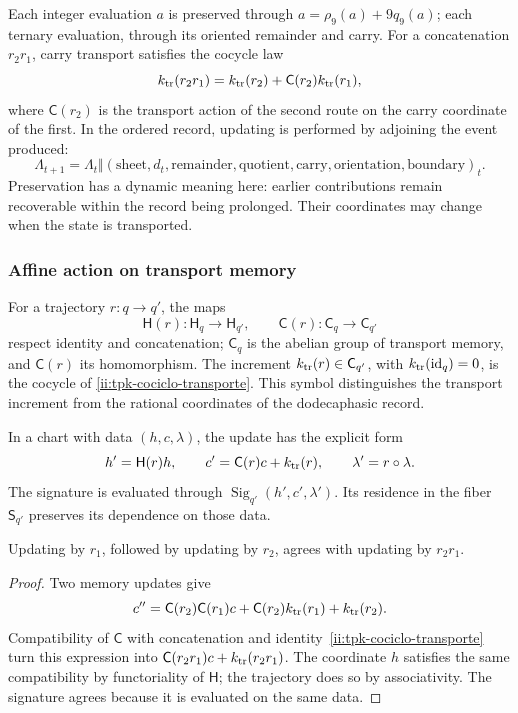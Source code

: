 Each integer evaluation \(a\) is preserved through
\(a=\rho_9(a)+9q_9(a)\); each ternary evaluation, through its oriented
remainder and carry. For a concatenation \(r_2r_1\), carry
transport satisfies the cocycle law
\begin{equation}
 k_{\rm tr}(r_2r_1)
 =k_{\rm tr}(r_2)+\mathsf C(r_2)k_{\rm tr}(r_1),
 \label{ii:tpk-cociclo-transporte}
\end{equation}
where \(\mathsf C(r_2)\) is the transport action of the second route
on the carry coordinate of the first. In the ordered record,
updating is performed by adjoining the event produced:
\[
 \Lambda_{t+1}=\Lambda_t\Vert
 (\text{sheet},d_t,\text{remainder},\text{quotient},
   \text{carry},\text{orientation},\text{boundary})_t.
\]
Preservation has a dynamic meaning here: earlier contributions
remain recoverable within the record being prolonged.
Their coordinates may change when the state is transported.

\subsubsection{Affine action on transport memory}

For a trajectory \(r:q\to q'\), the maps
\[
 \mathsf H(r):\mathsf H_q\to\mathsf H_{q'},\qquad
 \mathsf C(r):\mathsf C_q\to\mathsf C_{q'}
\]
respect identity and concatenation; \(\mathsf C_q\) is the abelian
group of transport memory, and \(\mathsf C(r)\) its homomorphism.
The increment \(k_{\rm tr}(r)\in\mathsf C_{q'}\), with
\(k_{\rm tr}(\operatorname{id}_q)=0\), is the cocycle of
\eqref{ii:tpk-cociclo-transporte}. This symbol distinguishes the transport
increment from the rational coordinates of the dodecaphasic record.

In a chart with data \((h,c,\lambda)\), the update has the
explicit form
\begin{equation}
 h'=\mathsf H(r)h,\qquad
 c'=\mathsf C(r)c+k_{\rm tr}(r),\qquad
 \lambda'=r\circ\lambda.
 \label{ii:tpk-accion-afin}
\end{equation}
The signature is evaluated through
\(\operatorname{Sig}_{q'}(h',c',\lambda')\). Its residence in the
fiber \(\mathsf S_{q'}\) preserves its dependence on those data.

\begin{proposition}
\label{ii:tpk-composicion-afin}
Updating by \(r_1\), followed by updating by
\(r_2\), agrees with updating by \(r_2r_1\).
\end{proposition}
\begin{proof}
Two memory updates give
\[
 c''=\mathsf C(r_2)\mathsf C(r_1)c
       +\mathsf C(r_2)k_{\rm tr}(r_1)+k_{\rm tr}(r_2).
\]
Compatibility of \(\mathsf C\) with concatenation and
identity~\eqref{ii:tpk-cociclo-transporte} turn this expression
into \(\mathsf C(r_2r_1)c+k_{\rm tr}(r_2r_1)\).
The coordinate \(h\) satisfies the same compatibility by
functoriality of \(\mathsf H\); the trajectory does so by
associativity. The signature agrees because it is evaluated on the same data.
\end{proof}

